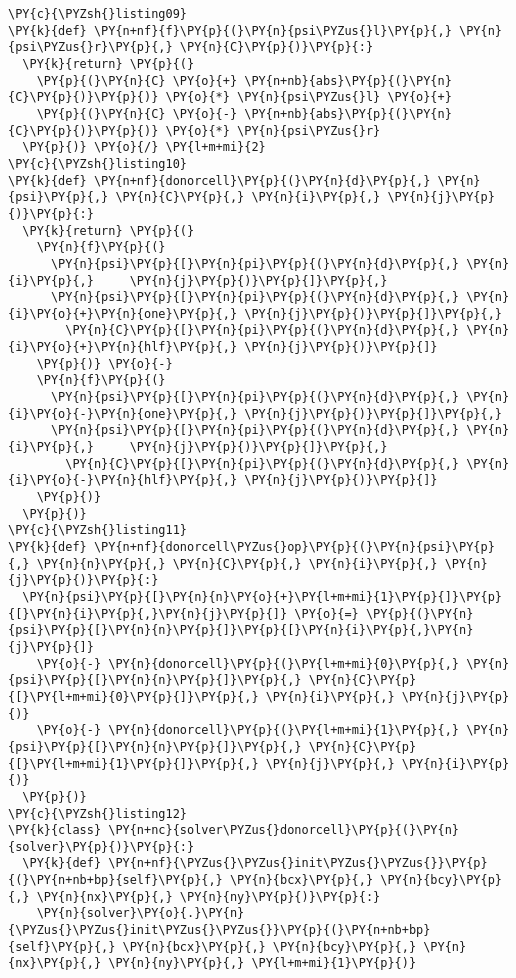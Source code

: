 \begin{Verbatim}[commandchars=\\\{\}]
\PY{c}{\PYZsh{}listing09}
\PY{k}{def} \PY{n+nf}{f}\PY{p}{(}\PY{n}{psi\PYZus{}l}\PY{p}{,} \PY{n}{psi\PYZus{}r}\PY{p}{,} \PY{n}{C}\PY{p}{)}\PY{p}{:}
  \PY{k}{return} \PY{p}{(}
    \PY{p}{(}\PY{n}{C} \PY{o}{+} \PY{n+nb}{abs}\PY{p}{(}\PY{n}{C}\PY{p}{)}\PY{p}{)} \PY{o}{*} \PY{n}{psi\PYZus{}l} \PY{o}{+} 
    \PY{p}{(}\PY{n}{C} \PY{o}{-} \PY{n+nb}{abs}\PY{p}{(}\PY{n}{C}\PY{p}{)}\PY{p}{)} \PY{o}{*} \PY{n}{psi\PYZus{}r}
  \PY{p}{)} \PY{o}{/} \PY{l+m+mi}{2}
\PY{c}{\PYZsh{}listing10}
\PY{k}{def} \PY{n+nf}{donorcell}\PY{p}{(}\PY{n}{d}\PY{p}{,} \PY{n}{psi}\PY{p}{,} \PY{n}{C}\PY{p}{,} \PY{n}{i}\PY{p}{,} \PY{n}{j}\PY{p}{)}\PY{p}{:}
  \PY{k}{return} \PY{p}{(}
    \PY{n}{f}\PY{p}{(}
      \PY{n}{psi}\PY{p}{[}\PY{n}{pi}\PY{p}{(}\PY{n}{d}\PY{p}{,} \PY{n}{i}\PY{p}{,}     \PY{n}{j}\PY{p}{)}\PY{p}{]}\PY{p}{,} 
      \PY{n}{psi}\PY{p}{[}\PY{n}{pi}\PY{p}{(}\PY{n}{d}\PY{p}{,} \PY{n}{i}\PY{o}{+}\PY{n}{one}\PY{p}{,} \PY{n}{j}\PY{p}{)}\PY{p}{]}\PY{p}{,} 
        \PY{n}{C}\PY{p}{[}\PY{n}{pi}\PY{p}{(}\PY{n}{d}\PY{p}{,} \PY{n}{i}\PY{o}{+}\PY{n}{hlf}\PY{p}{,} \PY{n}{j}\PY{p}{)}\PY{p}{]}
    \PY{p}{)} \PY{o}{-} 
    \PY{n}{f}\PY{p}{(}
      \PY{n}{psi}\PY{p}{[}\PY{n}{pi}\PY{p}{(}\PY{n}{d}\PY{p}{,} \PY{n}{i}\PY{o}{-}\PY{n}{one}\PY{p}{,} \PY{n}{j}\PY{p}{)}\PY{p}{]}\PY{p}{,} 
      \PY{n}{psi}\PY{p}{[}\PY{n}{pi}\PY{p}{(}\PY{n}{d}\PY{p}{,} \PY{n}{i}\PY{p}{,}     \PY{n}{j}\PY{p}{)}\PY{p}{]}\PY{p}{,} 
        \PY{n}{C}\PY{p}{[}\PY{n}{pi}\PY{p}{(}\PY{n}{d}\PY{p}{,} \PY{n}{i}\PY{o}{-}\PY{n}{hlf}\PY{p}{,} \PY{n}{j}\PY{p}{)}\PY{p}{]}
    \PY{p}{)} 
  \PY{p}{)}
\PY{c}{\PYZsh{}listing11}
\PY{k}{def} \PY{n+nf}{donorcell\PYZus{}op}\PY{p}{(}\PY{n}{psi}\PY{p}{,} \PY{n}{n}\PY{p}{,} \PY{n}{C}\PY{p}{,} \PY{n}{i}\PY{p}{,} \PY{n}{j}\PY{p}{)}\PY{p}{:}
  \PY{n}{psi}\PY{p}{[}\PY{n}{n}\PY{o}{+}\PY{l+m+mi}{1}\PY{p}{]}\PY{p}{[}\PY{n}{i}\PY{p}{,}\PY{n}{j}\PY{p}{]} \PY{o}{=} \PY{p}{(}\PY{n}{psi}\PY{p}{[}\PY{n}{n}\PY{p}{]}\PY{p}{[}\PY{n}{i}\PY{p}{,}\PY{n}{j}\PY{p}{]} 
    \PY{o}{-} \PY{n}{donorcell}\PY{p}{(}\PY{l+m+mi}{0}\PY{p}{,} \PY{n}{psi}\PY{p}{[}\PY{n}{n}\PY{p}{]}\PY{p}{,} \PY{n}{C}\PY{p}{[}\PY{l+m+mi}{0}\PY{p}{]}\PY{p}{,} \PY{n}{i}\PY{p}{,} \PY{n}{j}\PY{p}{)}
    \PY{o}{-} \PY{n}{donorcell}\PY{p}{(}\PY{l+m+mi}{1}\PY{p}{,} \PY{n}{psi}\PY{p}{[}\PY{n}{n}\PY{p}{]}\PY{p}{,} \PY{n}{C}\PY{p}{[}\PY{l+m+mi}{1}\PY{p}{]}\PY{p}{,} \PY{n}{j}\PY{p}{,} \PY{n}{i}\PY{p}{)}
  \PY{p}{)}
\PY{c}{\PYZsh{}listing12}
\PY{k}{class} \PY{n+nc}{solver\PYZus{}donorcell}\PY{p}{(}\PY{n}{solver}\PY{p}{)}\PY{p}{:}
  \PY{k}{def} \PY{n+nf}{\PYZus{}\PYZus{}init\PYZus{}\PYZus{}}\PY{p}{(}\PY{n+nb+bp}{self}\PY{p}{,} \PY{n}{bcx}\PY{p}{,} \PY{n}{bcy}\PY{p}{,} \PY{n}{nx}\PY{p}{,} \PY{n}{ny}\PY{p}{)}\PY{p}{:}
    \PY{n}{solver}\PY{o}{.}\PY{n}{\PYZus{}\PYZus{}init\PYZus{}\PYZus{}}\PY{p}{(}\PY{n+nb+bp}{self}\PY{p}{,} \PY{n}{bcx}\PY{p}{,} \PY{n}{bcy}\PY{p}{,} \PY{n}{nx}\PY{p}{,} \PY{n}{ny}\PY{p}{,} \PY{l+m+mi}{1}\PY{p}{)}


\end{Verbatim}
